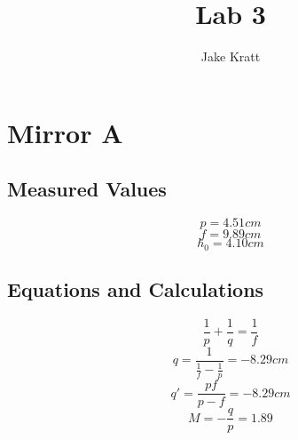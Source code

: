 \documentclass[12pt, letterpaper]{article}
\title{Lab 3}
\author{Jake Kratt}
\begin{document}
\maketitle

\section*{Mirror A}
\subsection*{Measured Values}
\[p=4.51cm\]
\[f=9.89cm\]
\[h_{0}=4.10cm\]
\subsection*{Equations and Calculations}
\[\frac{1}{p}+\frac{1}{q} = \frac{1}{f}\]
\[q = \frac{1}{\frac{1}{f}-\frac{1}{p}}=-8.29cm\]
\[q'=\frac{pf}{p-f}=-8.29cm\]
\[M=-\frac{q}{p}=1.89\]
\end{document}
